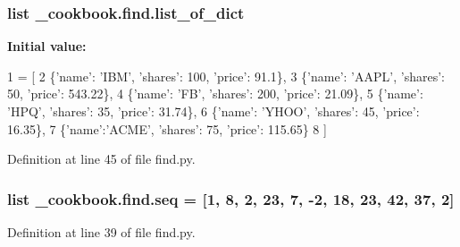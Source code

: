\hypertarget{namespace__cookbook_1_1find_a687bf0a1e78a409f1fe7c38291568113}{
\subsubsection[{list\-\_\-of\-\_\-dict}]{\setlength{\rightskip}{0pt plus 5cm}list \-\_\-cookbook.\-find.\-list\-\_\-of\-\_\-dict}}\label{namespace__cookbook_1_1find_a687bf0a1e78a409f1fe7c38291568113}
{\bfseries Initial value\-:}
\begin{DoxyCode}
1 = [
2         \{\textcolor{stringliteral}{'name'}: \textcolor{stringliteral}{'IBM'}, \textcolor{stringliteral}{'shares'}: 100, \textcolor{stringliteral}{'price'}: 91.1\},
3         \{\textcolor{stringliteral}{'name'}: \textcolor{stringliteral}{'AAPL'}, \textcolor{stringliteral}{'shares'}: 50, \textcolor{stringliteral}{'price'}: 543.22\},
4         \{\textcolor{stringliteral}{'name'}: \textcolor{stringliteral}{'FB'}, \textcolor{stringliteral}{'shares'}: 200, \textcolor{stringliteral}{'price'}: 21.09\},
5         \{\textcolor{stringliteral}{'name'}: \textcolor{stringliteral}{'HPQ'}, \textcolor{stringliteral}{'shares'}: 35, \textcolor{stringliteral}{'price'}: 31.74\},
6         \{\textcolor{stringliteral}{'name'}: \textcolor{stringliteral}{'YHOO'}, \textcolor{stringliteral}{'shares'}: 45, \textcolor{stringliteral}{'price'}: 16.35\},
7         \{\textcolor{stringliteral}{'name'}:\textcolor{stringliteral}{'ACME'}, \textcolor{stringliteral}{'shares'}: 75, \textcolor{stringliteral}{'price'}: 115.65\}
8 ]
\end{DoxyCode}


Definition at line 45 of file find.\-py.

\hypertarget{namespace__cookbook_1_1find_a2b63929bb9d60c107a94ede0430dd2c6}{
\subsubsection[{seq}]{\setlength{\rightskip}{0pt plus 5cm}list \-\_\-cookbook.\-find.\-seq = \mbox{[}1, 8, 2, 23, 7, -\/2, 18, 23, 42, 37, 2\mbox{]}}}\label{namespace__cookbook_1_1find_a2b63929bb9d60c107a94ede0430dd2c6}


Definition at line 39 of file find.\-py.

